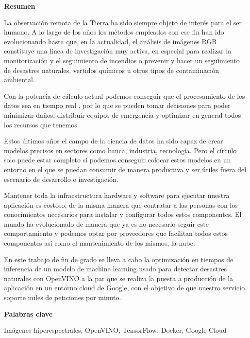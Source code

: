 \cleardoublepage
\begin{center}

{\bf \Huge Resumen}

\end{center}

La observación remota de la Tierra ha sido siempre objeto de interés para el ser humano.
A lo largo de los años los métodos empleados con ese fin han ido evolucionando hasta que, en la actualidad, el análisis de imágenes RGB constituye una línea de
investigación muy activa, en especial para realizar la monitorización y el seguimiento de incendios o prevenir y hacer un seguimiento de desastres naturales, vertidos químicos
u otros tipos de contaminación ambiental.

Con la potencia de cálculo actual podemos conseguir que el procesamiento de los datos sea en tiempo real , por lo que se pueden tomar decisiones para poder minimizar daños, distribuir
equipos de emergencia y optimizar en general todos los recursos que tenemos.

Estos últimos años el campo de la ciencia de datos ha sido capaz de crear modelos precisos en sectores como banca, industria, tecnología.
Pero el círculo solo puede estar completo si podemos
conseguir colocar estos modelos en un entorno en el que se puedan consumir de manera productiva y ser útiles fuera del escenario de desarrollo e investigación.

Mantener toda la infraestructura hardware y software para ejecutar nuestra aplicación es costoso, de la misma manera que contratar a las personas con los conocimientos necesarios
para instalar y configurar todos estos componentes.
El mundo ha evolucionado de manera que ya es no necesario seguir este comportamiento y podemos optar por proveedores que facilitan todos estos componentes
así como el mantenimiento de los mismos, la nube.

En este trabajo de fin de grado se lleva a cabo la optimización en tiempos de inferencia de un modelo de machine learning usado para detectar desastres naturales con OpenVINO a la par que se realiza la puesta a
producción de la aplicación en un entorno cloud de Google, con el objetivo de que nuestro servicio soporte miles de peticiones por minuto.

\vspace{0.8cm}
\begin{center}


{\bf \Large Palabras clave}

\end{center}

Imágenes hiperespectrales, OpenVINO, TensorFlow, Docker, Google Cloud

\vspace{0.3cm}